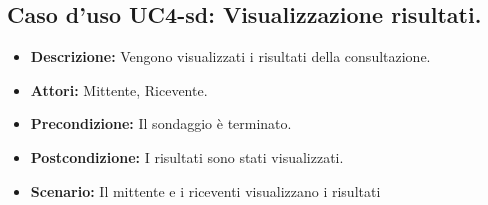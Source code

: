 \subsection{Caso d'uso UC4-sd: Visualizzazione risultati.}
\begin{itemize}
\item[]\textbf{Descrizione:} Vengono visualizzati i risultati della consultazione.
\item[]\textbf{Attori:} Mittente, Ricevente. 
\item[]\textbf{Precondizione:} Il sondaggio è terminato. 
\item[]\textbf{Postcondizione:} I risultati sono stati visualizzati. 
\item[]\textbf{Scenario:}
Il mittente e i riceventi visualizzano i risultati 
\end{itemize}

\clearpage

